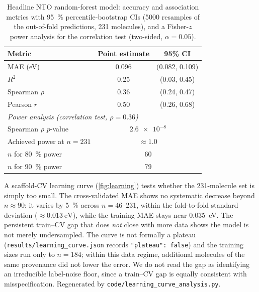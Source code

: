 \documentclass[twoside,twocolumn,9pt]{extarticle}
\begin{document}
\begin{table}[htbp]
  \centering
  \caption{Headline NTO random-forest model: accuracy and association metrics
    with \qty{95}{\percent} percentile-bootstrap CIs (\num{5000} resamples of the
    out-of-fold predictions, \num{231} molecules), and a Fisher-$z$ power analysis
    for the correlation test (two-sided, $\alpha = 0.05$).}
  \label{tab:metrics_ci}
  \small
  \begin{tabular}{lcc}
    \toprule
    Metric & Point estimate & 95\% CI \\
    \midrule
    MAE (eV)            & 0.096 & (0.082, 0.109) \\
    $R^2$               & 0.25  & (0.03, 0.45) \\
    Spearman $\rho$     & 0.36  & (0.24, 0.47) \\
    Pearson $r$         & 0.50  & (0.26, 0.68) \\
    \midrule
    \multicolumn{3}{l}{\emph{Power analysis (correlation test, $\rho = 0.36$)}} \\
    Spearman $\rho$ $p$-value     & \multicolumn{2}{c}{$\num{2.6e-8}$} \\
    Achieved power at $n = 231$   & \multicolumn{2}{c}{$\approx 1.0$} \\
    $n$ for \qty{80}{\percent} power & \multicolumn{2}{c}{60} \\
    $n$ for \qty{90}{\percent} power & \multicolumn{2}{c}{79} \\
    \bottomrule
  \end{tabular}
\end{table}

A scaffold-CV learning curve (\cref{fig:learning}) tests whether the
\num{231}-molecule set is simply too small. The cross-validated MAE shows no
systematic decrease beyond $n \approx 90$: it varies by \qty{5}{\percent} across
$n = 46$--\num{231}, within the fold-to-fold standard deviation
($\approx \qty{0.013}{\electronvolt}$), while the training MAE stays near
\qty{0.035}{\electronvolt}. The persistent train--CV gap that does \emph{not} close
with more data shows the model is not merely undersampled. The curve is not formally a
plateau (\texttt{results/learning\_curve.json} records \texttt{"plateau": false}) and the
training sizes run only to $n = \num{184}$; within this data regime,
additional molecules of the same provenance did not lower the error. We do not read the
gap as identifying an irreducible label-noise floor, since a train--CV gap is equally
consistent with misspecification. Regenerated by
\texttt{code/learning\_curve\_analysis.py}.
\end{document}
